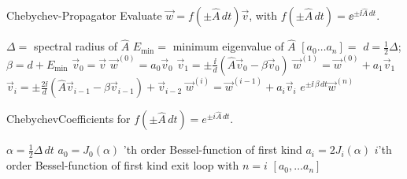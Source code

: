 \begin{algorithm}
  \caption{{\sc Chebychev-Propagator}
  Evaluate $\vec{w} = f(\pm\hat{A}\,dt) \vec{v}$,
  with $f(\pm\hat{A}\,dt) = \ee^{\pm\ii \hat{A}\,dt}$.
  \label{al:ChebyProp}
  }
  \begin{algorithmic}[1]
    \Statex
    \Statex
     \State $\Delta =$ spectral radius of $\hat{A}$
     \State $E_{\min} =$ minimum eigenvalue of $\hat{A}$
     \State $[a_0 \dots a_n] =$ 
            \label{Cheby:CallExpChebyCeoffs}
     \State $d = \frac{1}{2} \Delta$;
            $\beta = d + E_{\min}$
     \State $\vec{v}_0 = \vec{v}$
     \State $\vec{w}^{(0)} = a_0 \vec{v}_0$
     \State $\vec{v}_1 = \pm\frac{\ii}{d}\left(
                            \hat{A} \vec{v}_0 - \beta \vec{v}_0
                         \right)$
            \label{Cheby:H_norm1}
     \State $\vec{w}^{(1)} = \vec{w}^{(0)} + a_1 \vec{v}_1$
       \State $\vec{v}_i = \pm \frac{2 \ii}{d}\left(
                            \hat{A} \vec{v}_{i-1} - \beta \vec{v}_{i-1}
                            \right) + \vec{v}_{i-2}$
              \label{Cheby:H_norm2}
       \State $\vec{w}^{(i)} = \vec{w}^{(i-1)} + a_i \vec{v}_i$
     \EndFor
     \State \Return $e^{\pm \ii\,\beta\,dt} \vec{w}^{(n)}$
   \EndProcedure
  \end{algorithmic}
\end{algorithm}

\begin{algorithm}
  \caption{{\sc ChebychevCoefficients}
  for $f(\pm \hat{A}\,dt) = e^{\pm i \hat{A}\,dt}$.
  \label{al:ExpChebyCoeffs}
  }
  \begin{algorithmic}[1]
    \Statex
    \Statex
     \State $\alpha = \frac{1}{2} \Delta \, dt$
     \State $a_0 = J_0(\alpha)$
     'th order Bessel-function of first kind
       \State $a_{i} = 2 J_i(\alpha)$
       \Comment $i$'th order Bessel-function of first kind
        exit loop with $n=i$
     \EndFor
     \State \Return $[a_0, \dots a_n]$
   \EndProcedure
  \end{algorithmic}
\end{algorithm}

